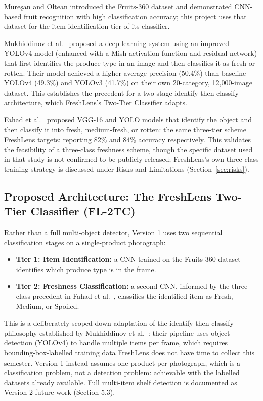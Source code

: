 \documentclass[12pt,a4paper]{article}
\begin{document}
Mure\c{s}an and Oltean \cite{muresan2018} introduced the Fruits-360 dataset and demonstrated CNN-based fruit recognition with high classification accuracy; this project uses that dataset for the item-identification tier of its classifier.

Mukhiddinov et al.~\cite{mukhiddinov2022} proposed a deep-learning system using an improved YOLOv4 model (enhanced with a Mish activation function and residual network) that first identifies the produce type in an image and then classifies it as fresh or rotten. Their model achieved a higher average precision (50.4\%) than baseline YOLOv4 (49.3\%) and YOLOv3 (41.7\%) on their own 20-category, 12{,}000-image dataset. This establishes the precedent for a two-stage identify-then-classify architecture, which FreshLens's Two-Tier Classifier adapts.

Fahad et al.~\cite{fahad2022} proposed VGG-16 and YOLO models that identify the object and then classify it into fresh, medium-fresh, or rotten: the same three-tier scheme FreshLens targets: reporting 82\% and 84\% accuracy respectively. This validates the feasibility of a three-class freshness scheme, though the specific dataset used in that study is not confirmed to be publicly released; FreshLens's own three-class training strategy is discussed under Risks and Limitations (Section~\ref{sec:risks}).

\subsection{Proposed Architecture: The FreshLens Two-Tier Classifier (FL-2TC)}

Rather than a full multi-object detector, Version 1 uses two sequential classification stages on a single-product photograph:

\begin{itemize}[leftmargin=1.2cm]
    \item \textbf{Tier 1: Item Identification:} a CNN trained on the Fruits-360 dataset \cite{fruits360} identifies which produce type is in the frame.
    \item \textbf{Tier 2: Freshness Classification:} a second CNN, informed by the three-class precedent in Fahad et al.~\cite{fahad2022}, classifies the identified item as Fresh, Medium, or Spoiled.
\end{itemize}

This is a deliberately scoped-down adaptation of the identify-then-classify philosophy established by Mukhiddinov et al.~\cite{mukhiddinov2022}: their pipeline uses object detection (YOLOv4) to handle multiple items per frame, which requires bounding-box-labelled training data FreshLens does not have time to collect this semester. Version 1 instead assumes one product per photograph, which is a classification problem, not a detection problem: achievable with the labelled datasets already available. Full multi-item shelf detection is documented as Version 2 future work (Section 5.3).
\end{document}

